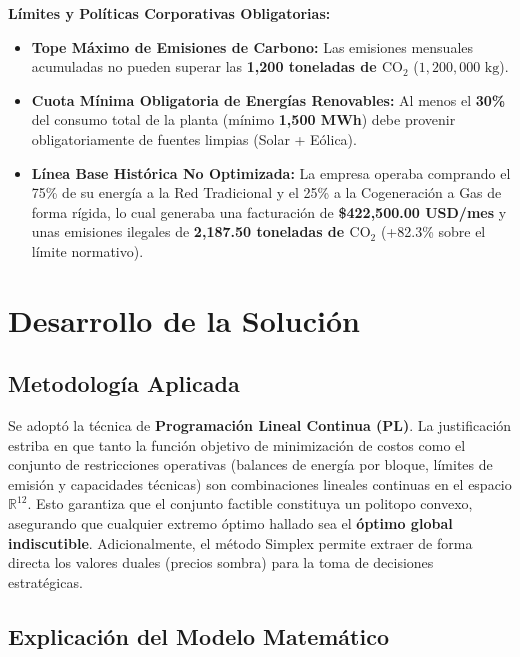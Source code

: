 \documentclass[11pt,a4paper]{article}
\begin{document}
\begin{tcolorbox}[colback=white, colframe=primary, arc=2mm, title=\textbf{Enunciado Oficial del Ejercicio de Optimización Energética}]
\textbf{Límites y Políticas Corporativas Obligatorias:}
\begin{itemize}
    \item \textbf{Tope Máximo de Emisiones de Carbono:} Las emisiones mensuales acumuladas no pueden superar las \textbf{1,200 toneladas de $\text{CO}_2$} ($1,200,000\text{ kg}$).
    \item \textbf{Cuota Mínima Obligatoria de Energías Renovables:} Al menos el \textbf{30\%} del consumo total de la planta (mínimo \textbf{1,500 MWh}) debe provenir obligatoriamente de fuentes limpias (Solar + Eólica).
    \item \textbf{Línea Base Histórica No Optimizada:} La empresa operaba comprando el 75\% de su energía a la Red Tradicional y el 25\% a la Cogeneración a Gas de forma rígida, lo cual generaba una facturación de \textbf{\$422,500.00 USD/mes} y unas emisiones ilegales de \textbf{2,187.50 toneladas de $\text{CO}_2$} (+82.3\% sobre el límite normativo).
\end{itemize}
\end{tcolorbox}

\section{Desarrollo de la Solución}

\subsection{Metodología Aplicada}
Se adoptó la técnica de \textbf{Programación Lineal Continua (PL)}. La justificación estriba en que tanto la función objetivo de minimización de costos como el conjunto de restricciones operativas (balances de energía por bloque, límites de emisión y capacidades técnicas) son combinaciones lineales continuas en el espacio $\mathbb{R}^{12}$. Esto garantiza que el conjunto factible constituya un politopo convexo, asegurando que cualquier extremo óptimo hallado sea el \textbf{óptimo global indiscutible}. Adicionalmente, el método Simplex permite extraer de forma directa los valores duales (precios sombra) para la toma de decisiones estratégicas.

\subsection{Explicación del Modelo Matemático}
\end{document}
